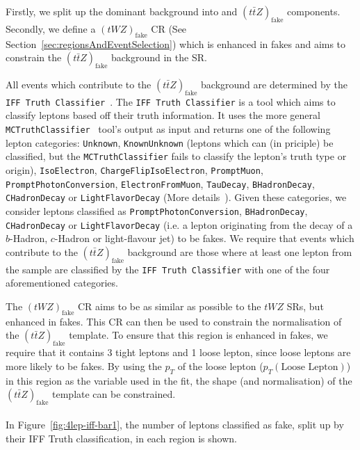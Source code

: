 Firstly, we split up the dominant \ttZ background into \ttZ and $(t\bar{t}Z)_{\text{fake}}$ components. Secondly, we define a $(tWZ)_{\text{fake}}$ CR (See Section~\ref{sec:regionsAndEventSelection}) which is enhanced in fakes and aims to constrain the $(t\bar{t}Z)_{\text{fake}}$ background in the SR.

 All events which contribute to the $(t\bar{t}Z)_{\text{fake}}$ background are determined by the \texttt{IFF Truth Classifier}~\cite{IFFTruthClassifier}. The \texttt{IFF Truth Classifier} is a tool which aims to classify leptons based off their truth information. It uses the more general \texttt{MCTruthClassifier}~\cite{MCTruthClassifier} tool's output as input and returns one of the following lepton categories: \texttt{Unknown}, \texttt{KnownUnknown} (leptons which can (in priciple) be classified, but the \texttt{MCTruthClassifier} fails to classify the lepton's truth type or origin), \texttt{IsoElectron}, \texttt{ChargeFlipIsoElectron}, \texttt{PromptMuon}, \texttt{PromptPhotonConversion}, \texttt{ElectronFromMuon}, \texttt{TauDecay}, \texttt{BHadronDecay}, \texttt{CHadronDecay} or \texttt{LightFlavorDecay} (More details~\cite{IFFTruthClassifier-leptonCategories}). Given these categories, we consider leptons classified as \texttt{PromptPhotonConversion}, \texttt{BHadronDecay}, \texttt{CHadronDecay} or \texttt{LightFlavorDecay} (i.e. a lepton originating from the decay of a $b$-Hadron, $c$-Hadron or light-flavour jet) to be fakes. We require that events which contribute to the $(t\bar{t}Z)_{\text{fake}}$ background are those where at least one lepton from the \ttZ sample are classified by the \texttt{IFF Truth Classifier} with one of the four aforementioned categories.

The $(tWZ)_{\text{fake}}$ CR aims to be as similar as possible to the $tWZ$ SRs, but enhanced in fakes. This CR can then be used to constrain the normalisation of the $(t\bar{t}Z)_{\text{fake}}$ template. To ensure that this region is enhanced in fakes, we require that it contains 3 tight leptons and 1 loose lepton, since loose leptons are more likely to be fakes. By using the $p_{T}$ of the loose lepton ($p_{T}(\text{Loose Lepton})$) in this region as the variable used in the fit, the shape (and normalisation) of the $(t\bar{t}Z)_{\text{fake}}$ template can be constrained.\\\\

In Figure~\ref{fig:4lep-iff-bar1}, the number of leptons classified as fake, split up by their IFF Truth classification, in each region is shown.

